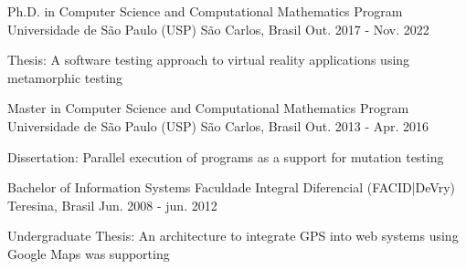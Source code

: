 

\begin{cventries}

  \cventry
    {Ph.D. in Computer Science and Computational Mathematics Program} %
    {Universidade de São Paulo (USP)} %
    {São Carlos, Brasil} %
    {Out. 2017 - Nov. 2022} %
    {
      \begin{cvitems} %
        \item {Thesis: A software testing approach to virtual reality applications using metamorphic testing}
      \end{cvitems}
    }

  \cventry
    {Master in Computer Science and Computational Mathematics Program} %
    {Universidade de São Paulo (USP)} %
    {São Carlos, Brasil} %
    {Out. 2013 - Apr. 2016} %
    {
      \begin{cvitems} %
        \item {Dissertation: Parallel execution of programs as a support for mutation testing}
      \end{cvitems}
    }
    
    \cventry
    {Bachelor of Information Systems} %
    {Faculdade Integral Diferencial (FACID|DeVry)} %
    {Teresina, Brasil} %
    {Jun. 2008 - jun. 2012} %
    {
      \begin{cvitems} %
        \item {Undergraduate Thesis: An architecture to integrate GPS into web systems using Google Maps was supporting}
      \end{cvitems}
    }

\end{cventries}

